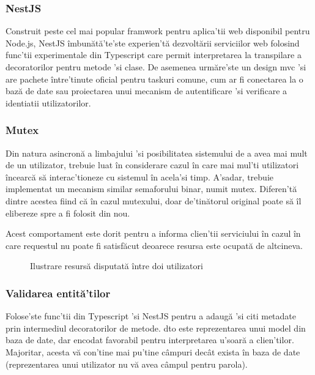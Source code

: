 \subsubsection {NestJS}

Construit peste cel mai popular framwork pentru aplica'tii web disponibil pentru Node.js, NestJS îmbunătă'te'ste experien'tă dezvoltării serviciilor web folosind func'tii experimentale din Typescript care permit interpretarea la transpilare a decoratorilor pentru metode 'si clase. De asemenea urmăre'ste un design \acrshort{mvc} 'si are pachete între'tinute oficial pentru taskuri comune, cum ar fi conectarea la o bază de date sau proiectarea unui mecanism de autentificare 'si verificare a identiatii utilizatorilor.

\subsubsection {Mutex}

Din natura asincronă a limbajului 'si posibilitatea sistemului de a avea mai mult de un utilizator, trebuie luat în considerare cazul în care mai mul'ti utilizatori încearcă să interac'tioneze cu sistemul în acela'si timp. A'sadar, trebuie implementat un mecanism similar semaforului binar, numit mutex. Diferen'tă dintre acestea fiind că în cazul mutexului, doar de'tinătorul original poate să îl elibereze spre a fi folosit din nou.

Acest comportament este dorit pentru a informa clien'tii serviciului în cazul în care requestul nu poate fi satisfăcut deoarece resursa este ocupată de altcineva.

\begin{figure}[H]
  \centering
  \caption{Ilustrare resursă disputată între doi utilizatori}
\end{figure}


\subsubsection {Validarea entită'tilor}

Folose'ste func'tii din Typescript 'si NestJS pentru a adaugă 'si citi metadate prin intermediul decoratorilor de metode. \acrfull{dto} este reprezentarea unui model din baza de date, dar encodat favorabil pentru interpretarea u'soară a clien'tilor. Majoritar, acesta vă con'tine mai pu'tine câmpuri decât exista în baza de date (reprezentarea unui utilizator nu vă avea câmpul pentru parola).

